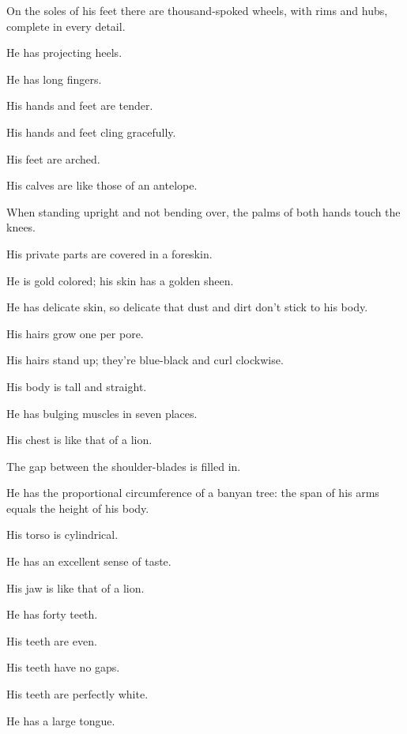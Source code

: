 \documentclass[12pt,openany]{book}%
\begin{document}
On the soles of his feet there are thousand-spoked wheels, with rims and hubs, complete in every detail. 

He has projecting heels. 

He has long fingers. 

His hands and feet are tender. 

His hands and feet cling gracefully. 

His feet are arched. 

His calves are like those of an antelope. 

When standing upright and not bending over, the palms of both hands touch the knees. 

His private parts are covered in a foreskin. 

He is gold colored; his skin has a golden sheen. 

He has delicate skin, so delicate that dust and dirt don’t stick to his body. 

His hairs grow one per pore. 

His hairs stand up; they’re blue-black and curl clockwise. 

His body is tall and straight. 

He has bulging muscles in seven places. 

His chest is like that of a lion. 

The gap between the shoulder-blades is filled in. 

He has the proportional circumference of a banyan tree: the span of his arms equals the height of his body. 

His torso is cylindrical. 

He has an excellent sense of taste. 

His jaw is like that of a lion. 

He has forty teeth. 

His teeth are even. 

His teeth have no gaps. 

His teeth are perfectly white. 

He has a large tongue. 
\end{document}
